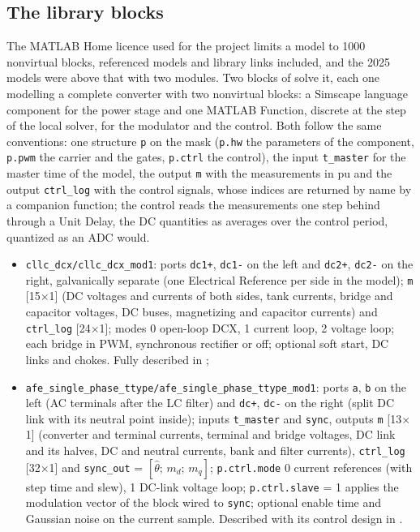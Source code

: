 \documentclass[12pt,a4paper]{scrartcl}
\begin{document}
\begin{onehalfspace}
\subsection{The library blocks}
\label{sec:bench2026_blocks}
The MATLAB Home licence used for the project limits a model to 1000 nonvirtual blocks, referenced models and library links included, and the 2025 models were above that with two modules. Two blocks of \cite{library_repo} solve it, each one modelling a complete converter with two nonvirtual blocks: a Simscape language component for the power stage and one MATLAB Function, discrete at the step of the local solver, for the modulator and the control. Both follow the same conventions: one structure \texttt{p} on the mask (\texttt{p.hw} the parameters of the component, \texttt{p.pwm} the carrier and the gates, \texttt{p.ctrl} the control), the input \texttt{t\_master} for the master time of the model, the output \texttt{m} with the measurements in pu and the output \texttt{ctrl\_log} with the control signals, whose indices are returned by name by a companion function; the control reads the measurements one step behind through a Unit Delay, the DC quantities as averages over the control period, quantized as an ADC would.

\begin{itemize}[nosep]
	\item \texttt{cllc\_dcx/cllc\_dcx\_mod1}: ports \texttt{dc1+}, \texttt{dc1-} on the left and \texttt{dc2+}, \texttt{dc2-} on the right, galvanically separate (one Electrical Reference per side in the model); \texttt{m} [15$\times$1] (DC voltages and currents of both sides, tank currents, bridge and capacitor voltages, DC buses, magnetizing and capacitor currents) and \texttt{ctrl\_log} [24$\times$1]; modes 0 open-loop DCX, 1 current loop, 2 voltage loop; each bridge in PWM, synchronous rectifier or off; optional soft start, DC links and chokes. Fully described in \cite{cllc_dcx_doc};
	\item \texttt{afe\_single\_phase\_ttype/afe\_single\_phase\_ttype\_mod1}: ports \texttt{a}, \texttt{b} on the left (AC terminals after the LC filter) and \texttt{dc+}, \texttt{dc-} on the right (split DC link with its neutral point inside); inputs \texttt{t\_master} and \texttt{sync}, outputs \texttt{m} [13$\times$1] (converter and terminal currents, terminal and bridge voltages, DC link and its halves, DC and neutral currents, bank and filter currents), \texttt{ctrl\_log} [32$\times$1] and \texttt{sync\_out} = $[\hat\theta;\, m_d;\, m_q]$; \texttt{p.ctrl.mode} 0 current references (with step time and slew), 1 DC-link voltage loop; \texttt{p.ctrl.slave} = 1 applies the modulation vector of the block wired to \texttt{sync}; optional enable time and Gaussian noise on the current sample. Described with its control design in \cite{spinv_doc}.
\end{itemize}


\end{onehalfspace}
\end{document}
